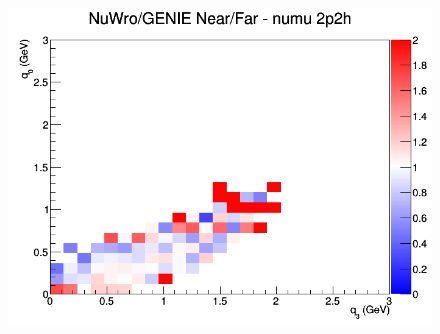 \documentclass[12pt]{article}
\begin{document}
\begin{figure}[h]
\endminipage
{}
\includegraphics[width=\linewidth]{eff_q0_q3/GAr/ratios/2p2h_NuWro_GENIE_numu_NF_q3_q0.png}
\endminipage
\newline
\end{figure}
\clearpage
\end{document}
